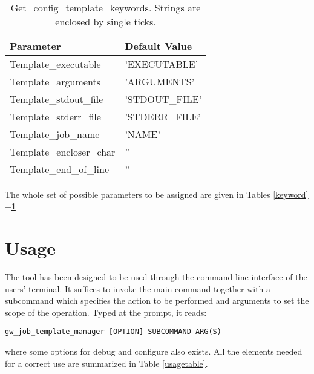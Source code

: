 \documentclass[12pt,a4paper]{article}
\newcommand{\tab}[1]{Table \ref{#1}}
\newcommand{\tabs}[2]{Tables \ref{#1}$-$\ref{#2}}
\begin{document}
\begin{table}
\center
{\tt
\begin{tabular}{ll}
\hline
\textrm{Parameter} & \textrm{Default Value}\\
\hline
	Template\_executable & 'EXECUTABLE'\\
	Template\_arguments & 'ARGUMENTS'\\
	Template\_stdout\_file & 'STDOUT\_FILE'\\
	Template\_stderr\_file & 'STDERR\_FILE'\\
	Template\_job\_name & 'NAME'\\
	Template\_encloser\_char & ''\\
	Template\_end\_of\_line & ''\\
\hline
\end{tabular}
}
\caption{Get\_config\_template\_keywords. Strings are enclosed by single ticks.}
\label{templatekeyword}
\end{table}
The whole set of possible parameters to be assigned are given in \tabs{keyword}{templatekeyword}


\section{Usage}\label{usage}

The tool has been designed to be used through the command line interface of the users' terminal. It suffices to invoke the main command together with a subcommand which specifies the action to be performed and arguments to set the scope of the operation. Typed at the prompt, it reads:
\begin{verbatim}
gw_job_template_manager [OPTION] SUBCOMMAND ARG(S)
\end{verbatim}
where some options for debug and configure also exists. All the elements needed for a correct use are summarized in \tab{usagetable}.
\end{document}
